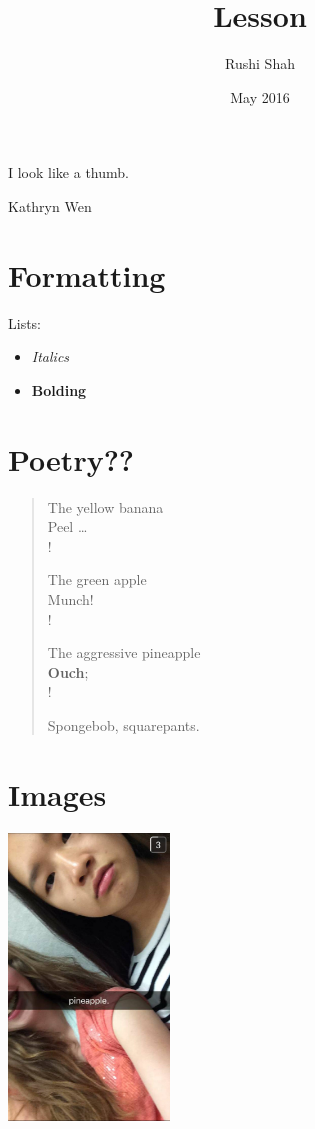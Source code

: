 \documentclass{article}
\title{Lesson}
\author{Rushi Shah}
\date{May 2016}
\begin{document}
\maketitle

\epigraph{I look like a thumb.}{Kathryn Wen}

\section{Formatting}

Lists: 

\begin{itemize}
  \item \textit{Italics}
  \item \textbf{Bolding}
\end{itemize}

\section{Poetry??}
\begin{verse}
The yellow banana \\
\vin Peel \ldots \\!

The green apple \\
\vin Munch! \\!

The aggressive pineapple \\
\vin \textbf{Ouch}; \\!

Spongebob, squarepants.

\end{verse}

\section{Images}

\includegraphics[height=3in]{pineapple}
\end{document}
